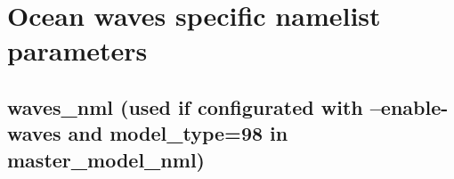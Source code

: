 %
%
%

\section{Ocean waves specific namelist parameters}

\subsection{waves\_nml (used if configurated with --enable-waves and model\_type=98 in master\_model\_nml)}

